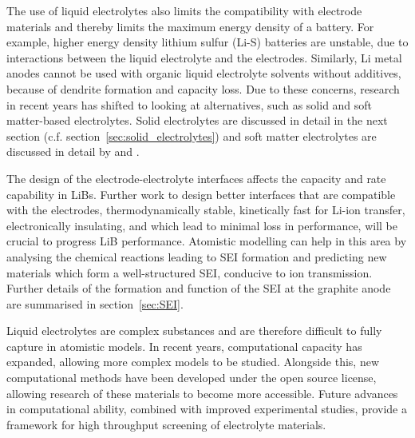 \documentclass[../main.tex]{subfiles}
\begin{document}
\begin{itemize}
    The use of liquid electrolytes also limits the compatibility with electrode materials and thereby limits the maximum energy density of a battery.\cite{Liu2019_e_den} For example, higher energy density lithium sulfur (Li-S) batteries are unstable, due to interactions between the liquid electrolyte and the electrodes.\cite{Zhang2013_PS} Similarly, Li metal anodes cannot be used with organic liquid electrolyte solvents without additives,\cite{Wu2019_Li_electrolyte} because of dendrite formation and capacity loss.\cite{Kushima2017, Lin2019_li_corrosion} Due to these concerns, research in recent years has shifted to looking at alternatives, such as solid and soft matter-based electrolytes.\cite{Zhang2018se_review} Solid electrolytes are discussed in detail in the next section (c.f. section~\ref{sec:solid_electrolytes}) and soft matter electrolytes are discussed in detail by \citeauthor{Hallinan_2013} and \citeauthor{popovic2011chemistry}.\cite{Hallinan_2013,popovic2011chemistry}
\end{itemize}
    
The design of the electrode-electrolyte interfaces affects the capacity and rate capability in LiBs.\cite{Xu2011,Xu2014} Further work to design better interfaces that are compatible with the electrodes, thermodynamically stable, kinetically fast for Li-ion transfer, electronically insulating, and which lead to minimal loss in performance, will be crucial to progress LiB performance.\cite{Xu2004, Goodenough2010, Yu2017} Atomistic modelling can help in this area by analysing the chemical reactions leading to SEI formation and predicting new materials which form a well-structured SEI, conducive to ion transmission.\cite{Wang2018} Further details of the formation and function of the SEI at the graphite anode are summarised in section~\ref{sec:SEI}.
    
Liquid electrolytes are complex substances and are therefore difficult to fully capture in atomistic models. In recent years, computational capacity has expanded, allowing more complex models to be studied. Alongside this, new computational methods have been developed under the open source license, allowing research of these materials to become more accessible.\cite{merlet_highly_2013, borodin_interfacial_2014, Simoncelli_2018,marin-lafleche_metalwalls_2020} Future advances in computational ability, combined with improved experimental studies, provide a framework for high throughput screening of electrolyte materials.
\end{document}
